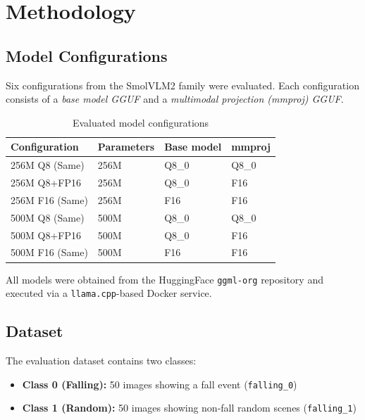 \documentclass[12pt, a4paper]{article}
\begin{document}
\section{Methodology}

\subsection{Model Configurations}

Six configurations from the SmolVLM2 family were evaluated. Each configuration
consists of a \emph{base model GGUF} and a \emph{multimodal projection (mmproj) GGUF}.

\begin{table}[H]
\centering
\caption{Evaluated model configurations}
\label{tab:configs}
\begin{tabular}{@{}llll@{}}
\toprule
\textbf{Configuration} & \textbf{Parameters} & \textbf{Base model} & \textbf{mmproj} \\
\midrule
256M Q8 (Same)  & 256M & Q8\_0 & Q8\_0 \\
256M Q8+FP16    & 256M & Q8\_0 & F16   \\
256M F16 (Same) & 256M & F16   & F16   \\
500M Q8 (Same)  & 500M & Q8\_0 & Q8\_0 \\
500M Q8+FP16    & 500M & Q8\_0 & F16   \\
500M F16 (Same) & 500M & F16   & F16   \\
\bottomrule
\end{tabular}
\end{table}

All models were obtained from the HuggingFace \texttt{ggml-org} repository and
executed via a \texttt{llama.cpp}-based Docker service.

\subsection{Dataset}

The evaluation dataset contains two classes:
\begin{itemize}
    \item \textbf{Class 0 (Falling):} 50 images showing a fall event (\texttt{falling\_0})
    \item \textbf{Class 1 (Random):} 50 images showing non-fall random scenes (\texttt{falling\_1})
\end{itemize}
\end{document}
